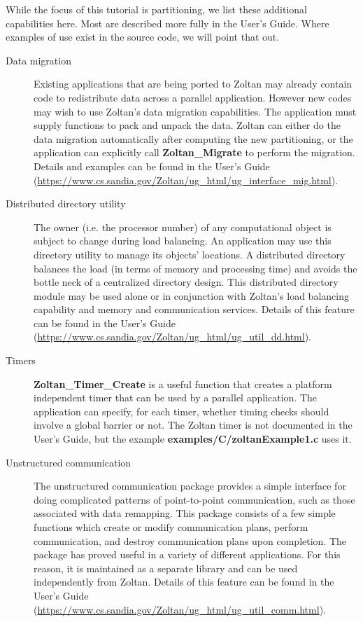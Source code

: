 While the focus of this tutorial is partitioning, we list these additional
capabilities here.  Most are described more fully in the User's Guide.
Where examples of use exist in the source code, we will point that out.

\begin{description}
\item [Data migration]
Existing applications that are being ported to Zoltan may already contain code to 
redistribute data across a parallel application.  However new codes may wish to
use Zoltan's data migration capabilities.  The application must supply functions
to pack and unpack the data.  Zoltan can either do the data migration automatically
after computing the new partitioning, or the application can explicitly call
\textbf{Zoltan\_Migrate} to perform the migration.  
Details and examples can be
found in the User's Guide
(\url{https://www.cs.sandia.gov/Zoltan/ug\_html/ug\_interface\_mig.html}).


\item [Distributed directory utility]
The owner (i.e. the processor number) of any computational object is subject to 
change during load balancing. An application may use this directory utility to 
manage its objects' locations. A distributed directory balances the load (in terms 
of memory and processing time) and avoids the bottle neck of a centralized directory design.
This distributed directory module may be used alone or in conjunction with Zoltan's 
load balancing capability and memory and communication services.
Details of this feature can be found in the User's Guide
(\url{https://www.cs.sandia.gov/Zoltan/ug\_html/ug\_util\_dd.html}).

\item [Timers]
\textbf{Zoltan\_Timer\_Create} is a useful function 
that creates a platform independent
timer that can be used by a parallel application.  The application can
specify, for each timer, whether timing checks should involve a
global barrier or not.  The Zoltan timer is not documented in the User's
Guide, but the example \textbf{examples/C/zoltanExample1.c} uses it.

\item [Unstructured communication]
The unstructured communication package provides a simple interface for 
doing complicated patterns of point-to-point communication, such as those 
associated with data remapping. This package consists of a few simple functions 
which create or modify communication plans, perform communication, and destroy 
communication plans upon completion. The package has proved useful in a 
variety of different applications. For this reason, it is maintained as a separate 
library and can be used independently from Zoltan.
Details of this feature can be found in the User's Guide
(\url{https://www.cs.sandia.gov/Zoltan/ug\_html/ug\_util\_comm.html}).


\end{description}
